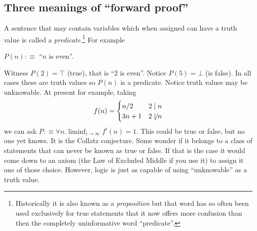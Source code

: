 \subsection{Three meanings of ``forward proof''}
 A sentence that may contain variables which when 
assigned can have a truth value is called a \emph{predicate}.\footnote{Historically it 
is also known as a \emph{proposition} but that word has so often been used exclusively 
for true statements that it now offers more confusion than then the completely uninformative word ``predicate''.}  
For example 
\begin{center}
    $P(n):\equiv$ ``$n$ is even''.
\end{center}
Witness $P(2)=\top$ (true), that is ``$2$ is even''.  
Notice $P(5)=\bot$ (is false).  In all cases these are truth values
so $P(n)$ is a predicate.  Notice truth values may be unknowable.
At present for example, taking 
\[ 
    f(n) =\begin{cases} n/2 & 2\mid n\\ 3n+1 & 2\not\mid n \end{cases}
\]
we can ask $P:\equiv \forall n.\liminf_{i\to \infty}f^i(n)=1$.
This could be true or false, but no one yet knows.  It is the Collatz conjecture.
Some wonder if it belongs to a class of statements that can never be known
as true or false.  If that is the case it would come down to an axiom 
(the Law of Excluded Middle if you use it) to assign it one of those choice.
However, logic is just as capable of using ``unknowable'' as a truth value.

